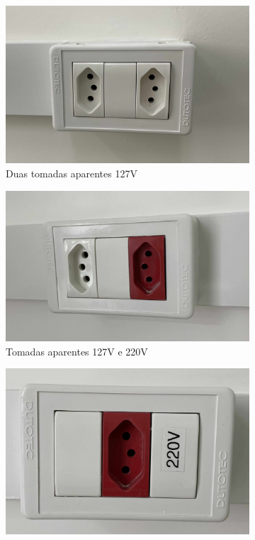 \begin{enumerate}
		\begin{figure}[H]
			\centering
			\begin{subfigure}[b]{0.23\textwidth}
				\centering
				\includegraphics[width=\textwidth]{Figures/4. Socket/tomada2.jpg}
				\caption{Duas tomadas aparentes 127V}
				\label{fig: style 2 image a}
			\end{subfigure}
			\hfill
			\centering
			\begin{subfigure}[b]{0.23\textwidth}
				\centering
				\includegraphics[width=\textwidth]{Figures/4. Socket/tomada3.jpg}
				\caption{Tomadas aparentes 127V e 220V}
				\label{fig: style 2 image b}
			\end{subfigure}
			\hfill
			\begin{subfigure}[b]{0.23\textwidth}
				\centering
				\includegraphics[width=\textwidth]{Figures/4. Socket/tomada4.jpg}

\end{subfigure}
\end{figure}
\end{enumerate}
